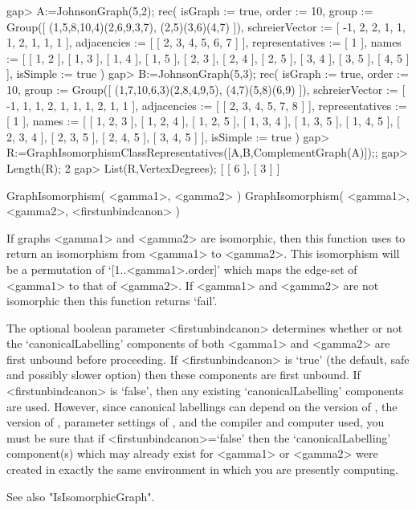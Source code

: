 \beginexample 
gap> A:=JohnsonGraph(5,2);
rec( isGraph := true, order := 10, 
  group := Group([ (1,5,8,10,4)(2,6,9,3,7), (2,5)(3,6)(4,7) ]), 
  schreierVector := [ -1, 2, 2, 1, 1, 1, 2, 1, 1, 1 ], 
  adjacencies := [ [ 2, 3, 4, 5, 6, 7 ] ], representatives := [ 1 ], 
  names := [ [ 1, 2 ], [ 1, 3 ], [ 1, 4 ], [ 1, 5 ], [ 2, 3 ], [ 2, 4 ], 
      [ 2, 5 ], [ 3, 4 ], [ 3, 5 ], [ 4, 5 ] ], isSimple := true )
gap> B:=JohnsonGraph(5,3);
rec( isGraph := true, order := 10, 
  group := Group([ (1,7,10,6,3)(2,8,4,9,5), (4,7)(5,8)(6,9) ]), 
  schreierVector := [ -1, 1, 1, 2, 1, 1, 1, 2, 1, 1 ], 
  adjacencies := [ [ 2, 3, 4, 5, 7, 8 ] ], representatives := [ 1 ], 
  names := [ [ 1, 2, 3 ], [ 1, 2, 4 ], [ 1, 2, 5 ], [ 1, 3, 4 ], [ 1, 3, 5 ], 
      [ 1, 4, 5 ], [ 2, 3, 4 ], [ 2, 3, 5 ], [ 2, 4, 5 ], [ 3, 4, 5 ] ], 
  isSimple := true )
gap> R:=GraphIsomorphismClassRepresentatives([A,B,ComplementGraph(A)]);;
gap> Length(R);
2
gap> List(R,VertexDegrees);
[ [ 6 ], [ 3 ] ]
\endexample


\>GraphIsomorphism( <gamma1>, <gamma2> )
\>GraphIsomorphism( <gamma1>, <gamma2>, <firstunbindcanon> )

If graphs <gamma1> and <gamma2> are isomorphic, then this function
uses {\nauty} to return an isomorphism from <gamma1> to <gamma2>. This
isomorphism will be a permutation of `[1..<gamma1>.order]' which maps
the edge-set of <gamma1> to that of <gamma2>. If <gamma1> and <gamma2>
are not isomorphic then this function  returns `fail'.

The optional boolean parameter <firstunbindcanon> determines whether or
not the `canonicalLabelling' components of both <gamma1> and <gamma2>
are first unbound before proceeding.  If <firstunbindcanon> is `true'
(the default, safe and possibly slower option) then these components
are first unbound.  If <firstunbindcanon> is `false', then any existing
`canonicalLabelling' components are used.  However, since canonical
labellings can depend on the version of {\nauty}, the version of
{\GRAPE}, parameter settings of {\nauty}, and the compiler and computer
used, you must be sure that if <firstunbindcanon>=`false' then the
`canonicalLabelling' component(s) which may already exist for <gamma1>
or <gamma2> were created in exactly the same environment in which you
are presently computing.

See also "IsIsomorphicGraph".

